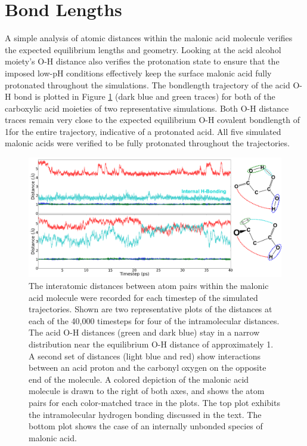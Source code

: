 \section{Bond Lengths}

A simple analysis of atomic distances within the malonic acid molecule verifies the expected equilibrium lengths and geometry. Looking at the acid alcohol moiety's O-H distance also verifies the protonation state to ensure that the imposed low-pH conditions effectively keep the surface malonic acid fully protonated throughout the simulations. The bondlength trajectory of the acid O-H bond is plotted in Figure \ref{fig:bondlength-trajectory} (dark blue and green traces) for both of the carboxylic acid moieties of two representative simulations. Both O-H distance traces remain very close to the expected equilibrium O-H covalent bondlength of 1\angs for the entire trajectory, indicative of a protonated acid. All five simulated malonic acids were verified to be fully protonated throughout the trajectories.

\begin{figure}[h!]
	\begin{center}
		\includegraphics[scale=1.0]{images/bond-length/bondlengths.png}
		\caption{The interatomic distances between atom pairs within the malonic acid molecule were recorded for each timestep of the simulated trajectories. Shown are two representative plots of the distances at each of the 40,000 timesteps for four of the intramolecular distances. The acid O-H distances (green and dark blue) stay in a narrow distribution near the equilibrium O-H distance of approximately 1\angs. A second set of distances (light blue and red) show interactions between an acid proton and the carbonyl oxygen on the opposite end of the molecule. A colored depiction of the malonic acid molecule is drawn to the right of both axes, and shows the atom pairs for each color-matched trace in the plots. The top plot exhibits the intramolecular hydrogen bonding discussed in the text. The bottom plot shows the case of an internally unbonded species of malonic acid.}
		\label{fig:bondlength-trajectory}
	\end{center}
\end{figure}

